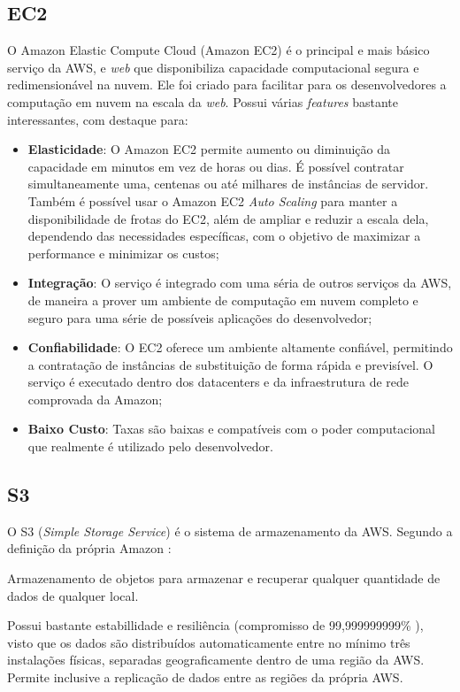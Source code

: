 \subsection{EC2}
O Amazon Elastic Compute Cloud (Amazon EC2) é o principal e mais básico serviço da AWS, e \textit{web} que disponibiliza capacidade computacional segura e redimensionável na nuvem. Ele foi criado para facilitar para os desenvolvedores a computação em nuvem na escala da \textit{web}. Possui várias \textit{features} bastante interessantes, com destaque para:
\begin{itemize}
  \item{\textbf{Elasticidade}: O Amazon EC2 permite aumento ou diminuição da capacidade em minutos em vez de horas ou dias. É possível contratar simultaneamente uma, centenas ou até milhares de instâncias de servidor. Também é possível usar o Amazon EC2 \textit{Auto Scaling} para manter a disponibilidade de frotas do EC2, além de ampliar e reduzir a escala dela, dependendo das necessidades específicas, com o objetivo de maximizar a performance e minimizar os custos;}
  \item{\textbf{Integração}: O serviço é integrado com uma séria de outros serviços da AWS, de maneira a prover um ambiente de computação em nuvem completo e seguro para uma série de possíveis aplicações do desenvolvedor;}
  \item{\textbf{Confiabilidade}: O EC2 oferece um ambiente altamente confiável, permitindo a contratação de instâncias de substituição de forma rápida e previsível. O serviço é executado dentro dos datacenters e da infraestrutura de rede comprovada da Amazon;}
  \item{\textbf{Baixo Custo}: Taxas são baixas e compatíveis com o poder computacional que realmente é utilizado pelo desenvolvedor.}
\end{itemize}

\subsection{S3}
O S3 (\textit{Simple Storage Service}) é o sistema de armazenamento da AWS. Segundo a definição da própria Amazon \cite{aws-s3}:

\begin{citacaoLonga}
Armazenamento de objetos para armazenar e recuperar qualquer quantidade de dados de qualquer local.
\end{citacaoLonga}

Possui bastante estabillidade e resiliência (compromisso de 99,999999999\% \cite{aws-s3}), visto que os dados são distribuídos automaticamente entre no mínimo três instalações físicas, separadas geograficamente dentro de uma região da AWS. Permite inclusive a replicação de dados entre as regiões da própria AWS.


